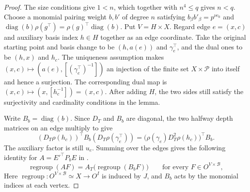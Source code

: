 \begin{proof}
The size conditions give $1<n$, which together with $n^4\le q$ gives $n<q$. Choose a monomial pairing weight $b,b'$ of degree $n$ satisfying $b_\beta b'_\beta=p^{\nu c_0}$ and $\operatorname{diag}(b)\rho(g^\top)=\rho(g)^\top\operatorname{diag}(b)$. Put $V=H\times X$. Regard edge $e=(x,c)$ and auxiliary basis index $h\in H$ together as an edge coordinate. Take the original starting point and basis change to be $(h,a(e))$ and $\gamma_e^\top$, and the dual ones to be $(h,x)$ and $h_c$. The uniqueness assumption makes $(x,c)\mapsto (a(e),[(\gamma_e^\top)^{-1}])$ an injection of the finite set $X\times\mathcal P$ into itself and hence a surjection. The corresponding dual map is $(x,c)\mapsto(x,[h_c^{-1}])=(x,c)$. After adding $H$, the two sides still satisfy the surjectivity and cardinality conditions in the lemma.

Write $B_b=\operatorname{diag}(b)$. Since $D_T$ and $B_b$ are diagonal, the two halfway depth matrices on an edge multiply to give
\[
  (D_T\rho(h_c))^\top B_b(D_T\rho(\gamma_e^\top))
    =\bigl(\rho(\gamma_e)D_T^2\rho(h_c)\bigr)^\top B_b .
\]
The auxiliary factor is still $u_e$. Summing over the edges gives the following identity for $A=E'^\top P_bE$ in .
\[
  \operatorname{regroup}(AF)
     = A_T\bigl(\operatorname{regroup}(B_bF)\bigr)
 \qquad\text{for every }F\in O^{V\times\mathcal B},
\]
Here $\operatorname{regroup}:O^{V\times\mathcal B}\simeq X\to O^I$ is induced by $J$, and $B_b$ acts by the monomial indices at each vertex.


\end{proof}

